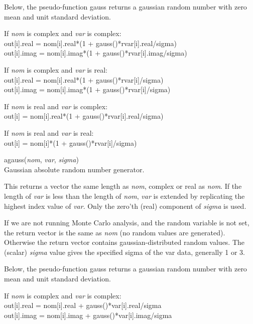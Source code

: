 \begin{description}
Below, the pseudo-function {\vt gauss} returns a gaussian random
number with zero mean and unit standard deviation.

\begin{description}
\item{If {\it nom} is complex and {\it var} is complex:}\\
  {\vt out[i].real = nom[i].real*(1 + gauss()*rvar[i].real/sigma)}\\
  {\vt out[i].imag = nom[i].imag*(1 + gauss()*rvar[i].imag/sigma)}

\item{If {\it nom} is complex and {\it var} is real:}\\
  {\vt out[i].real = nom[i].real*(1 + gauss()*rvar[i]/sigma)}\\
  {\vt out[i].imag = nom[i].imag*(1 + gauss()*rvar[i]/sigma)}

\item{If {\it nom} is real and {\it var} is complex:}\\
  {\vt out[i] = nom[i].real*(1 + gauss()*rvar[i].real/sigma)}

\item{If {\it nom} is real and {\it var} is real:}\\
  {\vt out[i] = nom[i]*(1 + gauss()*rvar[i]/sigma)}
\end{description}

\item{\vt agauss}({\it nom\/}, {\it var\/},
  {\it sigma\/})\\
Gaussian absolute random number generator.

This returns a vector the same length as {\it nom\/}, complex or real
as {\it nom\/}.  If the length of {\it var} is less than the length of
{\it nom\/}, {\it var} is extended by replicating the highest index
value of {\it var\/}.  Only the zero'th (real) component of {\it
sigma} is used.

If we are not running Monte Carlo analysis, and the {\et random}
variable is not set, the return vector is the same as {\it nom} (no
random values are generated).  Otherwise the return vector contains
gaussian-distributed random values.  The (scalar) {\it sigma} value
gives the specified sigma of the var data, generally 1 or 3.

Below, the pseudo-function {\vt gauss} returns a gaussian random
number with zero mean and unit standard deviation.

\begin{description}
\item{If {\it nom} is complex and {\it var} is complex:}\\
  {\vt out[i].real = nom[i].real + gauss()*var[i].real/sigma}\\
  {\vt out[i].imag = nom[i].imag + gauss()*var[i].imag/sigma}


\end{description}
\end{description}
